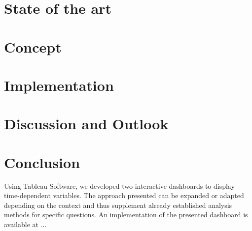 \documentclass[aac]{iosart2x}
\begin{document}
\section{State of the art}\label{s2}


\section{Concept}\label{s3}


\section{Implementation}\label{s4}

\section{Discussion and Outlook}\label{s5}

\section{Conclusion}\label{s6}
Using Tableau Software, we developed two interactive dashboards to display time-dependent variables. The approach presented can be expanded or adapted depending on the context and thus supplement already established analysis methods for specific questions. An implementation of the presented dashboard is available at ...






\end{document}
